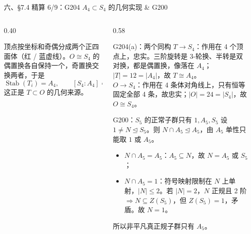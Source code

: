 \documentclass[aspectratio=169,10pt,fontset=none]{ctexbeamer}
\begin{document}
\begin{frame}[t]{六、\S7.4 精算 6/9：G204 $A_4\subset S_4$ 的几何实现 \& G200}
  \begin{columns}[T,onlytextwidth]
    \begin{column}{0.40\textwidth}
      \centering

      \footnotesize
      \raggedright
      顶点按坐标和奇偶分成两个正四面体（\textcolor{accent}{红} / \textcolor{ink}{蓝虚线}）。$O\cong S_4$ 的偶置换各自保持一个，奇置换交换两者，于是
      \[ \operatorname{Stab}(T_i)=A_4,\qquad [S_4:A_4]=2, \]
      这正是 $T\subset O$ 的几何来源。
    \end{column}
    \begin{column}{0.58\textwidth}
      \begin{block}{\footnotesize G204(a)：两个同构}
        \scriptsize
        $T\to S_4$：作用在 4 个顶点上，忠实。三阶旋转是 3-轮换、半转是双对换，都是偶置换，像落在 $A_4$；$|T|=12=|A_4|$，故 $T\cong A_4$。\\
        $O\to S_4$：作用在 4 条体对角线上，只有恒等固定全部 4 条，故忠实；$|O|=24=|S_4|$，故 $O\cong S_4$。
      \end{block}
      \begin{alertblock}{\footnotesize G200：$S_5$ 的正常子群只有 $1,A_5,S_5$}
        \scriptsize
        设 $1\ne N\trianglelefteq S_5$。则 $N\cap A_5\trianglelefteq A_5$，由 $A_5$ 单性只能取 $1$ 或 $A_5$。
        \begin{itemize}\setlength{\itemsep}{0pt}
          \item $N\cap A_5=A_5$：$A_5\subseteq N$，故 $N=A_5$ 或 $S_5$；
          \item $N\cap A_5=1$：符号映射限制在 $N$ 上单射，$|N|\le2$。若 $|N|=2$，$N$ 正规且 2 阶 $\Rightarrow N\subseteq Z(S_5)$，但 $Z(S_5)=1$，矛盾。故 $N=1$。
        \end{itemize}
        所以非平凡真正规子群只有 $A_5$。
      \end{alertblock}
    \end{column}
  \end{columns}
\end{frame}
\end{document}
